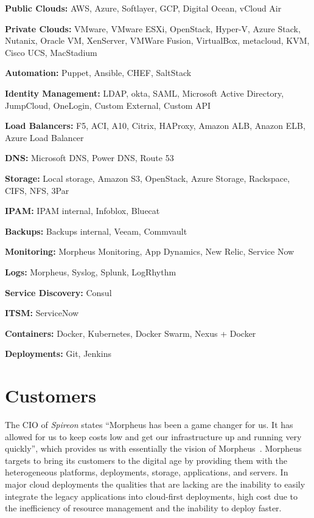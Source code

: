 \begin{description} 
	\item \textbf{Public Clouds:} AWS, Azure, Softlayer, GCP,
	Digital Ocean, vCloud Air 
	\item \textbf{Private Clouds:} VMware, VMware 
	ESXi, OpenStack, Hyper-V, Azure Stack, Nutanix, Oracle VM, XenServer, 
	VMWare Fusion, VirtualBox, metacloud, KVM, Cisco UCS, MacStadium 
	\item \textbf{Automation:} Puppet, Ansible, CHEF, SaltStack 
	\item \textbf{Identity Management:} LDAP, okta, SAML, Microsoft Active 
	Directory, JumpCloud, OneLogin, Custom External, Custom API 
	\item \textbf{Load Balancers:} F5, ACI, A10, Citrix, HAProxy, 
	Amazon ALB, Anazon ELB, Azure Load Balancer 
	\item \textbf{DNS:} Microsoft DNS, Power DNS, Route 53 
	\item \textbf{Storage:} Local storage, Amazon S3, OpenStack,
	Azure Storage, Rackspace, CIFS, NFS, 3Par 
	\item \textbf{IPAM:} IPAM internal, Infoblox, Bluecat 
	\item \textbf{Backups:} Backups internal, Veeam, Commvault
	\item \textbf{Monitoring:} Morpheus Monitoring, App Dynamics, New Relic,
	Service Now 
	\item \textbf{Logs:} Morpheus, Syslog, Splunk, LogRhythm 
	\item \textbf{Service Discovery:} Consul \item \textbf{ITSM:} ServiceNow 
	\item \textbf{Containers:} Docker, Kubernetes, Docker Swarm, Nexus + Docker 
	\item \textbf{Deployments:} Git, Jenkins 
\end{description}

\section{Customers} 
\label{sec:customers}

The CIO of \textit{Spireon} states ``Morpheus has been a game changer for us.
It has allowed for us to keep costs low and get our infrastructure up and
running very quickly'', which provides us with essentially the vision of
Morpheus~\cite{hid-sp18-416-www-morpheus-silicon-review}. Morpheus targets to
bring its customers to the digital age by providing them with the heterogeneous
platforms, deployments, storage, applications, and servers. In major cloud
deployments the qualities that are lacking are the inability to easily
integrate the legacy applications into cloud-first deployments, high cost due
to the inefficiency of resource management and the inability to deploy faster.

